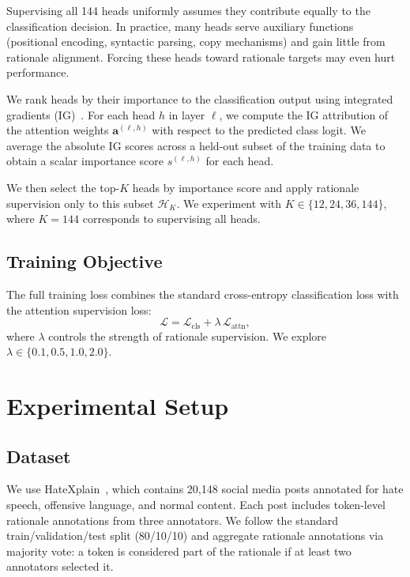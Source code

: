 \documentclass{article}
\begin{document}
Supervising all 144 heads uniformly assumes they contribute equally to the
classification decision. In practice, many heads serve auxiliary functions
(positional encoding, syntactic parsing, copy mechanisms) and gain little
from rationale alignment. Forcing these heads toward rationale targets may
even hurt performance.

We rank heads by their importance to the classification output using
integrated gradients (IG)~\citep{sundararajan2017axiomatic}. For each head
$h$ in layer $\ell$, we compute the IG attribution of the attention weights
$\mathbf{a}^{(\ell,h)}$ with respect to the predicted class logit. We
average the absolute IG scores across a held-out subset of the training data
to obtain a scalar importance score $s^{(\ell,h)}$ for each head.

We then select the top-$K$ heads by importance score and apply rationale
supervision only to this subset $\mathcal{H}_K$. We experiment with
$K \in \{12, 24, 36, 144\}$, where $K{=}144$ corresponds to supervising
all heads.

\subsection{Training Objective}
\label{sec:objective}

The full training loss combines the standard cross-entropy classification
loss with the attention supervision loss:
\begin{equation}
  \mathcal{L} = \mathcal{L}_{\text{cls}} + \lambda \, \mathcal{L}_{\text{attn}},
  \label{eq:total_loss}
\end{equation}
where $\lambda$ controls the strength of rationale supervision. We explore
$\lambda \in \{0.1, 0.5, 1.0, 2.0\}$.

\section{Experimental Setup}
\label{sec:setup}

\subsection{Dataset}

We use HateXplain~\citep{mathew2021hatexplain}, which contains 20,148 social
media posts annotated for hate speech, offensive language, and normal
content. Each post includes token-level rationale annotations from three
annotators. We follow the standard train/validation/test split (80/10/10)
and aggregate rationale annotations via majority vote: a token is considered
part of the rationale if at least two annotators selected it.
\end{document}
